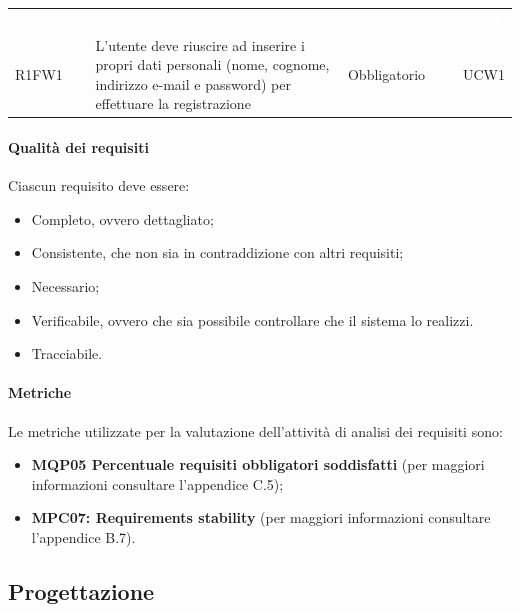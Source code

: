 \begin{table}[!htbp]
\renewcommand{\arraystretch}{1.5}
\begin{tabular}{ m{}<{\centering}  m{}<{\centering}  m{}<{\centering}  m{}<{\centering}}
    \rowcolor{darkblue}
    \textcolor{white}{\textbf{Requisito}} &\textcolor{white}{\textbf{Descrizione}}& \textcolor{white}{\textbf{Classificazione}} & \textcolor{white}{\textbf{Fonti}}\\ 

    \rowcolor{gray!25} R1FW1 & L’utente deve riuscire ad inserire i propri dati personali (nome, cognome, indirizzo e-mail e password) per effettuare la registrazione & Obbligatorio & UCW1 \\

\end{tabular}
\end{table}

\paragraph{Qualità dei requisiti}
Ciascun requisito deve essere:
\begin{itemize}
  \item Completo, ovvero dettagliato;
  \item Consistente, che non sia in contraddizione con altri requisiti;
  \item Necessario;
  \item Verificabile, ovvero che sia possibile controllare che il sistema lo realizzi.
  \item Tracciabile.
\end{itemize}

\paragraph{Metriche}
Le metriche utilizzate per la valutazione dell'attività di analisi dei requisiti sono:
\begin{itemize}
\item \textbf{MQP05 Percentuale requisiti obbligatori soddisfatti} (per maggiori informazioni consultare l'appendice C.5);
\item \textbf{MPC07: Requirements stability} (per maggiori informazioni consultare l'appendice B.7).
\end{itemize}

\subsection{Progettazione}
